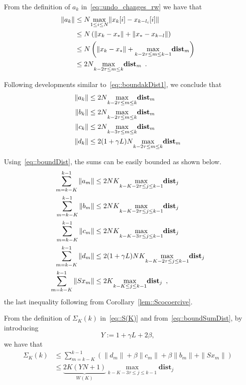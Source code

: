 \documentclass[envcountsect]{svjour3}
\newcommand{\dist}{{\mathbf{dist} }}
\begin{document}
From the definition of $a_k$ in~\eqref{eq::undo_changes_rw} we have that
\begin{align}{\label{eq::boundakDist1}}
\|a_k\| \nonumber & \leq N\underset{1\leq i\leq N}{\max}\|x_k[i]-x_{k-l_i}[i]\| \\
        \nonumber & \leq N\left(\|x_k-x_\ast\| + \|x_\ast-x_{k-l}\|\right) \\
        \nonumber & \leq N\left(\|x_k-x_\ast\| + \underset{k-2\tau \leq m \leq k-1}{\max}\dist_m\right) \\
                  & \leq 2N\underset{k-2\tau \leq m \leq k}{\max}\dist_m\enspace.
\end{align}

Following developments similar to~\eqref{eq::boundakDist1}, we conclude that
\begin{align}{\label{eq::boundDist}}
\|a_k\| \nonumber & \leq 2N\underset{k-2\tau \leq m \leq k}{\max}\dist_m \\
\|b_k\| \nonumber & \leq 2N\underset{k-2\tau \leq m \leq k}{\max}\dist_m \\
\|c_k\| \nonumber & \leq 2N\underset{k-3\tau \leq m \leq k}{\max}\dist_m \\
\|d_k\|           & \leq 2(1+\gamma L)N\underset{k-2\tau \leq m \leq k}{\max}\dist_m
\end{align}

Using~\eqref{eq::boundDist}, the sums can be easily bounded as shown below.
\begin{align}{\label{eq::boundSumDist}}
\sum_{m=k-K}^{k-1}\|a_m\| \nonumber & \leq 2NK\underset{k-K-2\tau \leq j \leq k-1}{\max}\dist_j \\
\sum_{m=k-K}^{k-1}\|b_m\| \nonumber & \leq 2NK\underset{k-K-2\tau \leq j \leq k-1}{\max}\dist_j \\
\sum_{m=k-K}^{k-1}\|c_m\| \nonumber & \leq 2NK\underset{k-K-3\tau \leq j \leq k-1}{\max}\dist_j \\
\sum_{m=k-K}^{k-1}\|d_m\| \nonumber & \leq 2(1+\gamma L)NK\underset{k-K-2\tau \leq j \leq k-1}{\max}\dist_j \\
\sum_{m=k-K}^{k-1}\|Sx_m\|          & \leq 2K\underset{k-K \leq j \leq k-1}{\max}\dist_j\enspace,
\end{align}
the last inequality following from Corollary~\ref{lem::Scocoercive}.

From the definition of $\Sigma_K(k)$ in~\eqref{eq::S(K)} and from~\eqref{eq::boundSumDist}, by introducing
\[
Y:=1+\gamma L+2\beta,
\]
we have that
\begin{align*}
\Sigma_K(k) &\leq \sum_{m=k-K}^{k-1}(\|d_m\| + \beta\|c_m\| + \beta \|b_m\| + \|Sx_m\|) \\
            &\leq \underbrace{2K(YN+1)}_{W(K)}\underset{k-K-3\tau \leq j \leq k-1}{\max}\dist_j
\end{align*}
\end{document}
